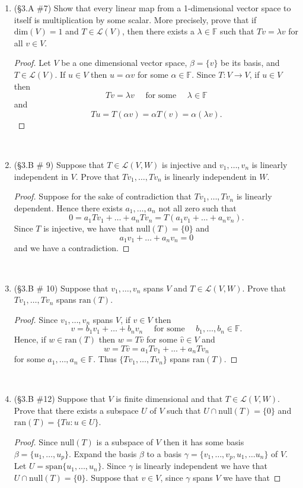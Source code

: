 \documentclass[12pt,letterpaper]{article}
\theoremstyle{plain}
\theoremstyle{definition}
\begin{document}
\begin{enumerate}[1.]
\item (\S 3.A \#7) Show that every linear map from a 1-dimensional vector space to itself is multiplication by some scalar. More precisely, prove that if $\text{dim}(V)=1$ and $T\in \mathcal{L}(V)$, then there exists a $\lambda \in \mathbb{F}$ such that $Tv=\lambda v$ for all $v\in V$.
\begin{proof}
Let $V$ be a one dimensional vector space, $\beta=\{v\}$ be its basis, and $T\in \mathcal{L}(V)$. If $u\in V$ then $u=\alpha v$ for some $\alpha\in \mathbb{F}$. Since $T:V\rightarrow V$, if $u\in V$ then 
\[Tv=\lambda v \quad\text{ for some }\quad\lambda\in \mathbb{F}\]
and
\[Tu=T(\alpha v)=\alpha T(v)=\alpha (\lambda v).\]
\end{proof}
\ \\
\item (\S 3.B \# 9) Suppose that $T\in \mathcal{L}(V,W)$ is injective and $v_1, \ldots ,v_n$ is linearly independent in $V$. Prove that $Tv_1,\ldots, Tv_n$ is linearly independent in $W$. 
\begin{proof}Suppose for the sake of contradiction that $Tv_1, \ldots , Tv_n$ is linearly dependent. Hence there exists $a_1, \ldots, a_n$ not all zero such that 
\[0=a_1Tv_1+\ldots + a_nTv_n=T(a_1v_1+\ldots +a_nv_n).\]
Since $T$ is injective, we have that $\text{null}(T)=\{0\}$ and 
\[a_1v_1+\ldots +a_nv_n=0\] and we have a contradiction.
\end{proof}
\ \\
\item (\S 3.B \# 10) Suppose that $v_1, \ldots, v_n$ spans $V$ and $T\in \mathcal{L}(V,W)$. Prove that $Tv_1, \ldots ,Tv_n$ spans $\text{ran}(T)$. 
\begin{proof}Since $v_1,\ldots, v_n$ spans $V$, if $v\in V$ then 
\[v=b_1v_1+\ldots +b_nv_n\quad \text{ for some }\quad b_1, \ldots, b_n\in \mathbb{F}.\]
Hence, if $w\in \text{ran}(T)$ then $w=T\hat{v}$ for some $\hat{v}\in V$ and 
\[w=T\hat{v}=a_1Tv_1+\ldots +a_nTv_n\] for some $a_1, \ldots, a_n\in \mathbb{F}$. Thus $\{Tv_1, \ldots, Tv_n\}$ spans $\text{ran}(T)$.
\end{proof}
\ \\
\item (\S 3.B \#12) Suppose that $V$ is finite dimensional and that $T\in \mathcal{L}(V,W)$. Prove that there exists a subspace $U$ of $V$ such that $U\cap \text{null}(T)=\{0\}$ and $\text{ran}(T)=\{Tu : u\in U\}$.
\begin{proof} Since $\text{null}(T)$ is a subspace of $V$ then it has some basis $\beta=\{u_1, \ldots, u_p\}$. Expand the basis $\beta$ to a basis $\gamma=\{v_1, \ldots, v_p,u_1,\ldots u_n\}$ of $V$. Let $U=\text{span}\{u_1,\ldots, u_n\}$. Since $\gamma$ is linearly independent we have that $U\cap \text{null}(T)=\{0\}$. Suppose that $v\in V$, since $\gamma$ spans $V$ we have that 

\end{proof}
\end{enumerate}
\end{document}
